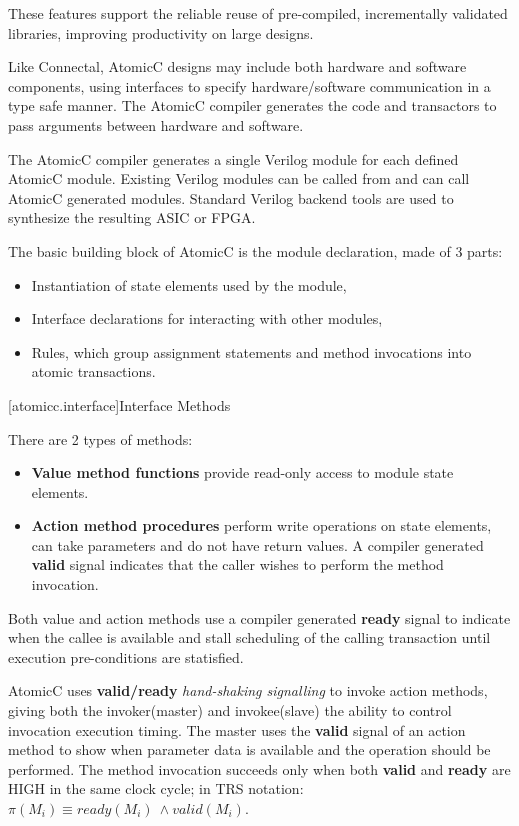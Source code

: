 These features support the reliable reuse of pre-compiled, incrementally validated
libraries, improving productivity on large designs.

Like Connectal\cite{king2015software}, AtomicC designs may include both hardware and
software components, using interfaces to specify hardware/software communication
in a type safe manner. The AtomicC compiler generates the code and transactors to pass
arguments between hardware and software.

The AtomicC compiler 
generates a single Verilog module for each defined AtomicC module.
Existing Verilog modules can be called from and can call AtomicC
generated modules.
Standard Verilog backend tools are used to synthesize
the resulting ASIC or FPGA.

The basic building block of AtomicC is the module declaration, made of 3 parts:
\begin{itemize}
\item Instantiation of state elements used by the module,
\item Interface declarations for interacting with other modules,
\item Rules, which group assignment statements and method invocations into atomic transactions.
\end{itemize}

[atomicc.interface]{Interface Methods}

There are 2 types of methods:
\begin{itemize}
\item \textbf{Value method functions} provide read-only access to module state elements.
\item \textbf{Action method procedures} perform write operations on state elements,
can take parameters and do not have return values.
A compiler generated
\textbf{valid} signal indicates that the caller wishes to perform the method invocation.
\end{itemize}

Both value and action methods use a compiler generated \textbf{ready} signal
to indicate when the callee is available and
stall scheduling of the calling transaction until
execution pre-conditions are statisfied.

AtomicC uses \textbf{valid/ready} \textit{hand-shaking signalling}
\cite{Fletcher2009, AXISpec} to invoke action methods,
giving both the invoker(master) and invokee(slave) the ability to control invocation
execution timing.
The master uses the \textbf{valid} signal
of an action method to show when parameter data is available
and the operation should be performed.
The method invocation succeeds only when
both \textbf{valid} and \textbf{ready} are HIGH in the same clock cycle;
in TRS notation\cite[p.~22]{Hoe:Thesis}: $\pi(M_{i}) \equiv ready(M_{i})\ \wedge valid(M_{i})$.

